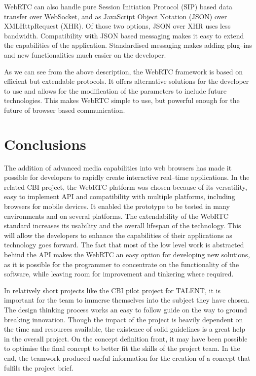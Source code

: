 \documentclass[english,12pt,a4paper,pdftex]{article}
\begin{document}
WebRTC can also handle pure Session Initiation Protocol (SIP) based data transfer over WebSocket, and as JavaScript Object Notation (JSON) over XMLHttpRequest (XHR). Of those two options, JSON over XHR uses less bandwidth. \cite{Adeyeye} Compatibility with JSON based messaging makes it easy to extend the capabilities of the application. Standardised messaging makes adding plug--ins and new functionalities much easier on the developer.

As we can see from the above description, the WebRTC framework is based on efficient but extendable protocols. It offers alternative solutions for the developer to use and allows for the modification of the parameters to include future technologies. This makes WebRTC simple to use, but powerful enough for the future of browser based communication.


\clearpage


\section{Conclusions}

The addition of advanced media capabilities into web browsers has made it possible for developers to rapidly create interactive real--time applications. In the related CBI project, the WebRTC platform was chosen because of its versatility, easy to implement API and compatibility with multiple platforms, including browsers for mobile devices. It enabled the prototype to be tested in many environments and on several platforms. The extendability of the WebRTC standard increases its usability and the overall lifespan of the technology. This will allow the developers to enhance the capabilities of their applications as technology goes forward. The fact that most of the low level work is abstracted behind the API makes the WebRTC an easy option for developing new solutions, as it is possible for the programmer to concentrate on the functionality of the software, while leaving room for improvement and tinkering where required.

In relatively short projects like the CBI pilot project for TALENT, it is important for the team to immerse themselves into the subject they have chosen. The design thinking process works an easy to follow guide on the way to ground breaking innovation. Though the impact of the project is heavily dependent on the time and resources available, the existence of solid guidelines is a great help in the overall project. On the concept definition front, it may have been possible to optimise the final concept to better fit the skills of the project team. In the end, the teamwork produced useful information for the creation of a concept that fulfils the project brief.
\end{document}

